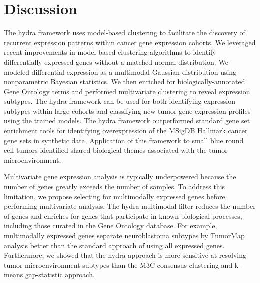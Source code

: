 \documentclass[10pt,letterpaper]{article}
\begin{document}
\section*{Discussion}
The hydra framework uses model-based clustering to facilitate the discovery of recurrent expression patterns within cancer gene expression cohorts. We leveraged recent improvements in model-based clustering algorithms to identify differentially expressed genes without a matched normal distribution. We modeled differential expression as a multimodal Gaussian distribution using nonparametric Bayesian statistics. We then enriched for biologically-annotated Gene Ontology terms and performed multivariate clustering to reveal expression subtypes. The hydra framework can be used for both identifying expression subtypes within large cohorts and classifying new tumor gene expression profiles using the trained models. The hydra framework outperformed standard gene set enrichment tools for identifying overexpression of the MSigDB Hallmark cancer gene sets in synthetic data. Application of this framework to small blue round cell tumors identified shared biological themes associated with the tumor microenvironment.
 
Multivariate gene expression analysis is typically underpowered because the number of genes greatly exceeds the number of samples. To address this limitation, we propose selecting for multimodally expressed genes before performing multivariate analysis. The hydra multimodal filter reduces the number of genes and enriches for genes that participate in known biological processes, including those curated in the Gene Ontology database. For example, multimodally expressed genes separate neuroblastoma subtypes by TumorMap analysis better than the standard approach of using all expressed genes. Furthermore, we showed that the hydra approach is more sensitive at resolving tumor microenvironment subtypes than the M3C consensus clustering and k-means gap-statistic approach. 
\end{document}
